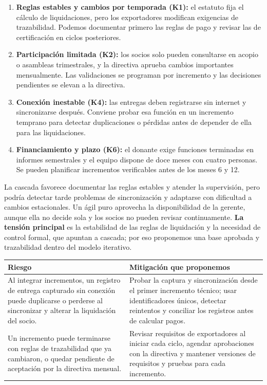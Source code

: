 \documentclass[10pt,letterpaper]{article}
\begin{document}
\begin{enumerate}[leftmargin=*,itemsep=1pt]
\item \textbf{Reglas estables y cambios por temporada (K1):} el estatuto fija el cálculo de liquidaciones, pero los exportadores modifican exigencias de trazabilidad. Podemos documentar primero las reglas de pago y revisar las de certificación en ciclos posteriores.
\item \textbf{Participación limitada (K2):} los socios solo pueden consultarse en acopio o asambleas trimestrales, y la directiva aprueba cambios importantes mensualmente. Las validaciones se programan por incremento y las decisiones pendientes se elevan a la directiva.
\item \textbf{Conexión inestable (K4):} las entregas deben registrarse sin internet y sincronizarse después. Conviene probar esa función en un incremento temprano para detectar duplicaciones o pérdidas antes de depender de ella para las liquidaciones.
\item \textbf{Financiamiento y plazo (K6):} el donante exige funciones terminadas en informes semestrales y el equipo dispone de doce meses con cuatro personas. Se pueden planificar incrementos verificables antes de los meses 6 y 12.
\end{enumerate}
\par
La cascada favorece documentar las reglas estables y atender la supervisión, pero podría detectar tarde problemas de sincronización y adaptarse con dificultad a cambios estacionales. Un ágil puro aprovecha la disponibilidad de la gerente, aunque ella no decide sola y los socios no pueden revisar continuamente. \textbf{La tensión principal} es la estabilidad de las reglas de liquidación y la necesidad de control formal, que apuntan a cascada; por eso proponemos una base aprobada y trazabilidad dentro del modelo iterativo.
\par
\begin{tabularx}{\linewidth}{@{}p{6cm}Y@{}}
\color{white}\textbf{Riesgo}&\color{white}\textbf{Mitigación que proponemos}\\\midrule
Al integrar incrementos, un registro de entrega capturado sin conexión puede duplicarse o perderse al sincronizar y alterar la liquidación del socio.&Probar la captura y sincronización desde el primer incremento técnico; usar identificadores únicos, detectar reintentos y conciliar los registros antes de calcular pagos.\\
Un incremento puede terminarse con reglas de trazabilidad que ya cambiaron, o quedar pendiente de aceptación por la directiva mensual.&Revisar requisitos de exportadores al iniciar cada ciclo, agendar aprobaciones con la directiva y mantener versiones de requisitos y pruebas para cada incremento.\\
\end{tabularx}

\par
\end{document}
